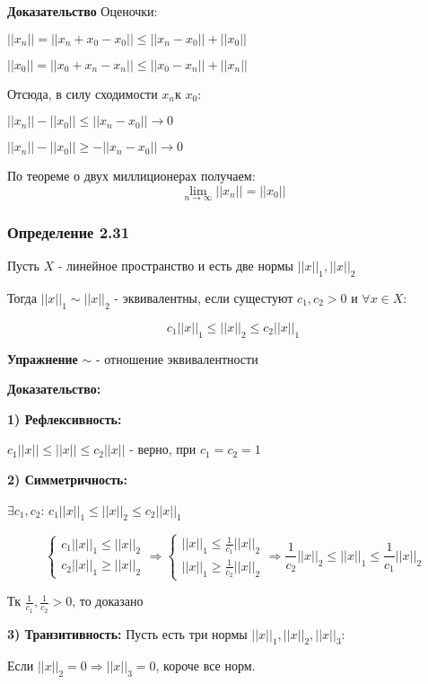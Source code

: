 \documentclass[12pt, english]{article}
\begin{document}
\textbf{Доказательство}		
	Оценочки:
	
	$||x_n|| = ||x_n + x_0 - x_0|| \leq ||x_n - x_0|| + ||x_0||$
	
	$||x_0|| = ||x_0 + x_n - x_n|| \leq ||x_0 - x_n|| + ||x_n||$
	
	Отсюда, в силу сходимости ${x_n}$к $x_0$:
	
	$||x_n|| - ||x_0|| \leq ||x_n - x_0|| \to 0 $
	
	$||x_n|| - ||x_0|| \ge -||x_n - x_0|| \to 0$
	
	По теореме о двух миллиционерах получаем: 	$$\lim_{n \to \infty} ||x_n|| = ||x_0||$$
	
\subsubsection*{Определение 2.31}
	Пусть $X$ - линейное пространство и есть две нормы $||x||_1, ||x||_2$
	
Тогда $||x||_1 \sim ||x||_2$ - эквивалентны, если сущестуют $c_1, c_2 > 0$ и $\forall x \in X$:

	$$c_1||x||_1 \leq ||x||_2 \leq c_2||x||_1$$
		
\textbf{Упражнение}		
	$\sim$ - отношение эквивалентности

\textbf{Доказательство:}

	\textbf{1) Рефлексивность:}
		
		$c_1||x|| \leq ||x|| \leq c_2||x||$ - верно, при $c_1 = c_2 = 1$
		
	\textbf{2)	Симметричность:}
	
		 $\exists c_1, c_2$:
		$c_1||x||_1 \leq ||x||_2 \leq c_2||x||_1$
	
$$
\begin{cases}
   c_1||x||_1 \leq ||x||_2 \\
   c_2||x||_1  \ge ||x||_2  
\end{cases}
\Rightarrow
\begin{cases}
   ||x||_1 \leq \frac{1}{c_1}||x||_2 \\
   ||x||_1  \ge \frac{1}{c_2}||x||_2  
   
\end{cases}
\Rightarrow
\frac{1}{c_2}||x||_2 \leq ||x||_1 \leq \frac{1}{c_1}||x||_2
$$

Тк $\frac{1}{c_1} , \frac{1}{c_2} > 0$, то доказано

			
	\textbf{3)	Транзитивность:}
	Пусть есть три нормы $||x||_1 , ||x||_2 , ||x||_3$:
	
	Если $||x||_2 = 0 \Rightarrow ||x||_3 = 0$, короче все норм.
	
\end{document}
